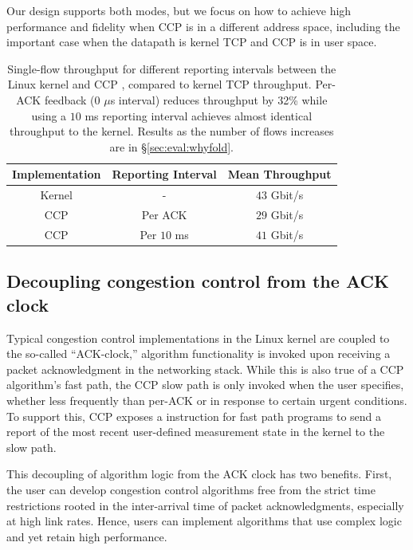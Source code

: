 
Our design supports both modes, but we focus on how to achieve high performance
and fidelity when CCP is in a different address space, including the important
case when the datapath is kernel TCP and CCP is in user space.

\begin{table}[]
    \centering
    \begin{tabular}{c|c|c}
        Implementation & Reporting Interval & Mean Throughput \\
        \hline
        Kernel & - & $43$ Gbit/s \\
        CCP & Per ACK & $29$ Gbit/s \\
        CCP & Per $10$ ms & $41$ Gbit/s \\
    \end{tabular}
    \caption{Single-flow throughput for different reporting intervals between
      the Linux kernel and CCP \userspace, compared to kernel TCP
      throughput. Per-ACK feedback (0 $\mu$s interval) reduces throughput by
      32\% while using a $10$ ms reporting interval
      achieves almost identical throughput to the kernel. Results as the number
      of flows  increases are in
      \S\ref{sec:eval:whyfold}.}\label{tab:perf:interval}
\end{table}

\subsection{Decoupling congestion control from the ACK clock}

Typical congestion control
implementations in the Linux kernel are coupled to the so-called ``ACK-clock,''
\ie algorithm functionality is invoked upon receiving a packet acknowledgment in
the networking stack.
%
While this is also true of a CCP algorithm's fast path, the CCP slow path is
only invoked when the user specifies, whether less frequently than per-ACK or in response to certain urgent conditions.
%
To support this, CCP exposes a  instruction for fast path programs to send a
report of the most recent user-defined measurement state in the kernel to the slow path.

This decoupling of algorithm logic from the ACK clock has two benefits.
%
First, the user can develop congestion control algorithms free from the strict
time restrictions rooted in the inter-arrival time of packet acknowledgments,
especially at high link rates.
Hence, users can implement algorithms that use complex logic and yet retain high performance.

